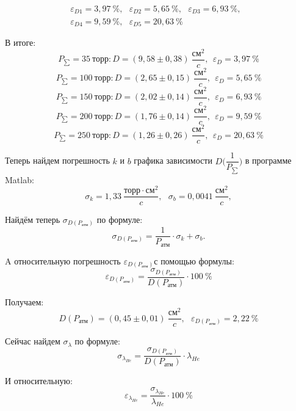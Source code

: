 \documentclass[a4paper,11.5pt]{article} %
\begin{document}
\begin{multline}
	\varepsilon_{D1} = 3,97\ \%,~~~\varepsilon_{D2} = 5,65\ \%,~~~\varepsilon_{D3} = 6,93\ \%,~~~\\
	\varepsilon_{D4} = 9,59\ \%,~~~\varepsilon_{D5} = 20,63\ \%~~~
\end{multline}

В итоге:
\[P_{\sum} = 35 \ \text{торр}: D = (9,58 \pm 0,38)\  \frac{\text{см}^2}{c}, \ ~ \varepsilon_{D} = 3,97\ \%\]
\[P_{\sum} = 100\ \text{торр}: D = (2,65 \pm 0,15)\  \frac{\text{см}^2}{c}, \ ~ \varepsilon_{D} = 5,65\ \%\]
\[P_{\sum} = 150\ \text{торр}: D = (2,02 \pm 0,14)\  \frac{\text{см}^2}{c}, \ ~ \varepsilon_{D} = 6,93\ \%\]
\[P_{\sum} = 200\ \text{торр}: D = (1,76 \pm 0,14)\  \frac{\text{см}^2}{c}, \ ~ \varepsilon_{D} = 9,59\ \%\]
\[P_{\sum} = 250\ \text{торр}: D = (1,26 \pm 0,26)\  \frac{\text{см}^2}{c}, \ ~ \varepsilon_{D} = 20,63\ \%\]

Теперь найдем погрешность $k$ и $b$ графика зависимости $D\bigg(\dfrac{1}{P_{\sum}}\bigg)$ в программе Matlab:
\begin{equation}
	\sigma_k = 1,33 \ \frac{\text{торр}\cdot \text{см}^2}{c}, \ ~ \ \sigma_b = 0,0041 \ \frac{\text{см}^2}{c},
\end{equation}

Найдём теперь $\sigma_{D(P_{\text{атм}})}$ по формуле:
\begin{equation}
	\sigma_{D(P_{\text{атм}})} = \dfrac{1}{P_{\text{атм}}} \cdot \sigma_k + \sigma_b.
\end{equation}

A относительную погрешность $\varepsilon_{D(P_{\text{атм}})}$с помощью формулы:
\begin{equation}
	\varepsilon_{D(P_{\text{атм}})} = \dfrac{\sigma_{D(P_{\text{атм}})}}{D(P_{\text{атм}})}\cdot 100\ \%
\end{equation}

Получаем:
\begin{equation}
	D(P_{\text{атм}}) = (0,45 \pm 0,01)\ \frac{\text{см}^2}{c}, \ ~ \ \varepsilon_{D(P_{\text{атм}})} = 2,22\ \%
\end{equation}

Сейчас найдем $\sigma_{\lambda}$ по формуле:
\begin{equation}
	\sigma_{\lambda_{He}} = \dfrac{\sigma_{D(P_{\text{атм}})}}{D(P_{\text{атм}})} \cdot \lambda_{He}
\end{equation}

И относительную:
\begin{equation}
	\varepsilon_{\lambda_{He}} = \dfrac{\sigma_{\lambda_{He}}}{\lambda_{He}}\cdot 100\ \%
\end{equation}
\end{document}

